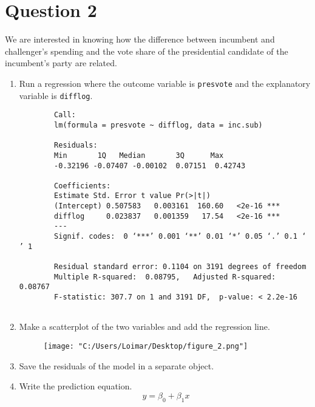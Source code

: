 \documentclass[12pt,letterpaper]{article}
\begin{document}
	
\newpage

\section*{Question 2}
\noindent We are interested in knowing how the difference between incumbent and challenger's spending and the vote share of the presidential candidate of the incumbent's party are related.	\vspace{.25cm}
	\begin{enumerate}
		\item Run a regression where the outcome variable is \texttt{presvote} and the explanatory variable is \texttt{difflog}.
			
			\begin{BVerbatim}
		Call:
		lm(formula = presvote ~ difflog, data = inc.sub)
		
		Residuals:
		Min       1Q   Median       3Q      Max 
		-0.32196 -0.07407 -0.00102  0.07151  0.42743 
		
		Coefficients:
		Estimate Std. Error t value Pr(>|t|)    
		(Intercept) 0.507583   0.003161  160.60   <2e-16 ***
		difflog     0.023837   0.001359   17.54   <2e-16 ***
		---
		Signif. codes:  0 ‘***’ 0.001 ‘**’ 0.01 ‘*’ 0.05 ‘.’ 0.1 ‘ ’ 1
		
		Residual standard error: 0.1104 on 3191 degrees of freedom
		Multiple R-squared:  0.08795,	Adjusted R-squared:  0.08767 
		F-statistic: 307.7 on 1 and 3191 DF,  p-value: < 2.2e-16
				
			\end{BVerbatim}
			\vspace{5cm}
		\item Make a scatterplot of the two variables and add the regression line.
			\begin{figure}[h!]
			\centering
			\texttt{[image: "C:/Users/Loimar/Desktop/figure\_2.png"]}
			\label{fig:plot_2}
		\end{figure}
		 	\vspace{5cm}
		\item Save the residuals of the model in a separate object.	
			
		\vspace{5cm}
		\item Write the prediction equation.
		\begin{equation}
			\ y = \beta_0 + \beta_1 x
		\end{equation}
	\end{enumerate}
	
\end{document}
